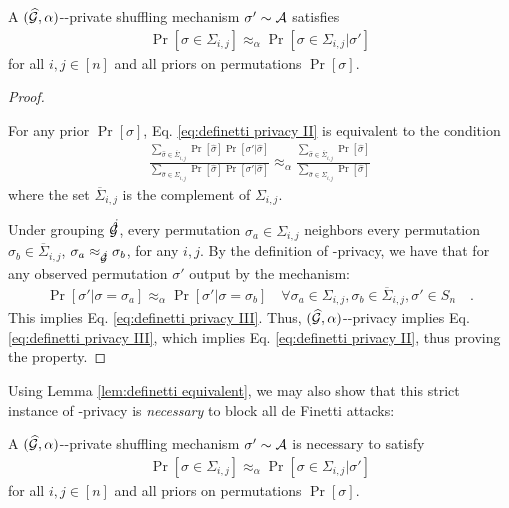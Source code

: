 \begin{prope}
A $(\widehat{\mathcal{G}}, \alpha)$-\name-private shuffling mechanism $\sigma' \sim \mathcal{A}$ satisfies  
\begin{align*}
    \Pr[\sigma \in \Sigma_{i,j} ] \approx_\alpha \Pr[\sigma \in \Sigma_{i,j} | \sigma']
\end{align*}
for all $i,j \in [n]$ and all priors on permutations $\Pr[\sigma]$. 
\end{prope}

\begin{proof}

\begin{lemma}
\label{lem:definetti equivalent}
    For any prior $\Pr[\sigma]$, Eq. \eqref{eq:definetti privacy II} is equivalent to the condition
    \begin{align}
        \frac{\sum_{\hat{\sigma} \in \overline{\Sigma}_{i,j}} \Pr[\hat{\sigma}] \Pr[\sigma' | \hat{\sigma}] }{
        \sum_{\hat{\sigma} \in {\Sigma_{i,j}}} \Pr[\hat{\sigma}] \Pr[\sigma' | \hat{\sigma}] } 
        \approx_\alpha 
        \frac{\sum_{\hat{\sigma} \in \overline{\Sigma}_{i,j}} \Pr[\hat{\sigma}] }{
        \sum_{\hat{\sigma} \in {\Sigma_{i,j}}} \Pr[\hat{\sigma}] }
        \label{eq:definetti privacy III}
    \end{align}
    where the set $\overline{\Sigma}_{i,j}$ is the complement of ${\Sigma}_{i,j}$. 
\end{lemma}
Under grouping $\hat{\calG}$, every permutation $\sigma_a \in {\Sigma}_{i,j}$ neighbors every permutation $\sigma_b \in \overline{\Sigma}_{i,j}$, $\sigma_a \approx_{\hat{\calG}} \sigma_b$, for any $i,j$. By the definition of \name-privacy, we have that for any observed permutation $\sigma'$ output by the mechanism: 
\begin{align*}
    \Pr[\sigma' | \sigma = \sigma_a] \approx_\alpha \Pr[\sigma' | \sigma = \sigma_b]
    \quad \forall \sigma_a \in {\Sigma}_{i,j}, \sigma_b \in \overline{\Sigma}_{i,j}, \sigma' \in S_n 
    \quad .
\end{align*}
This implies Eq. \ref{eq:definetti privacy III}. Thus, $(\widehat{\mathcal{G}}, \alpha)$-\name-privacy implies Eq. \ref{eq:definetti privacy III}, which implies Eq. \ref{eq:definetti privacy II}, thus proving the property. 
\end{proof}

Using Lemma \ref{lem:definetti equivalent}, we may also show that this strict instance of \name-privacy is \emph{necessary} to block all de Finetti attacks: 

\begin{prope}
A $(\widehat{\mathcal{G}}, \alpha)$-\name-private shuffling mechanism $\sigma' \sim \mathcal{A}$ is necessary to satisfy 
\begin{align*}
    \Pr[\sigma \in \Sigma_{i,j} ] \approx_\alpha \Pr[\sigma \in \Sigma_{i,j} | \sigma']
\end{align*}
for all $i,j \in [n]$ and all priors on permutations $\Pr[\sigma]$. 
\end{prope}

